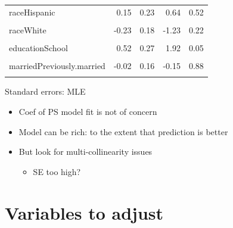 \documentclass[
]{book}
\providecommand{\tightlist}{%
  \setlength{\itemsep}{0pt}\setlength{\parskip}{0pt}}
\begin{document}
\begin{table}[!h]
\begin{threeparttable}
\begin{tabular}{lrrrr}
raceHispanic & 0.15 & 0.23 & 0.64 & 0.52\\
\cellcolor{gray!6}{raceOther} & \cellcolor{gray!6}{0.76} & \cellcolor{gray!6}{0.23} & \cellcolor{gray!6}{3.25} & \cellcolor{gray!6}{0.00}\\
\addlinespace
raceWhite & -0.23 & 0.18 & -1.23 & 0.22\\
\cellcolor{gray!6}{educationHigh.School} & \cellcolor{gray!6}{0.14} & \cellcolor{gray!6}{0.15} & \cellcolor{gray!6}{0.95} & \cellcolor{gray!6}{0.34}\\
educationSchool & 0.52 & 0.27 & 1.92 & 0.05\\
\cellcolor{gray!6}{marriedNever.married} & \cellcolor{gray!6}{-0.04} & \cellcolor{gray!6}{0.25} & \cellcolor{gray!6}{-0.16} & \cellcolor{gray!6}{0.88}\\
marriedPreviously.married & -0.02 & 0.16 & -0.15 & 0.88\\
\addlinespace
\cellcolor{gray!6}{bmi} & \cellcolor{gray!6}{0.10} & \cellcolor{gray!6}{0.01} & \cellcolor{gray!6}{10.14} & \cellcolor{gray!6}{0.00}\\
\bottomrule
\end{tabular}
\begin{tablenotes}
\item Standard errors: MLE
\end{tablenotes}
\end{threeparttable}
\end{table}

\begin{itemize}
\tightlist
\item
  Coef of PS model fit is not of concern
\item
  Model can be rich: to the extent that prediction is better
\item
  But look for multi-collinearity issues

  \begin{itemize}
  \tightlist
  \item
    SE too high?
  \end{itemize}
\end{itemize}

\hypertarget{variables-to-adjust}{%
\section{Variables to adjust}\label{variables-to-adjust}}

\citet{brookhart2006variable}
\end{document}
